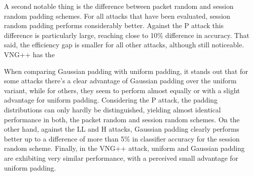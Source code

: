 \documentclass[
	ruledheaders=chapter,
	class=report,
	thesis={type=master, department=inf},
	accentcolor=1c,
	custommargins=true,
	marginpar=false,
	parskip=half-,
	fontsize=11pt,
]{tudapub}
\begin{document}
	A second notable thing is the difference between packet random and session random padding schemes. For all attacks that have been evaluated, session random padding performs considerably better. Against the P attack this difference is particularly large, reaching close to 10\% difference in accuracy. That said, the efficiency gap is smaller for all other attacks, although still noticeable. VNG++ has the 
	
	When comparing Gaussian padding with uniform padding, it stands out that for some attacks there's a clear advantage of Gaussian padding over the uniform variant, while for others, they seem to perform almost equally or with a slight advantage for uniform padding. Considering the P attack, the padding distributions can only hardly be distinguished, yielding almost identical performance in both, the packet random and session random schemes. On the other hand, against the LL and H attacks, Gaussian padding clearly performs better up to a difference of more than 5\% in classifier accuracy for the session random scheme. Finally, in the VNG++ attack, uniform and Gaussian padding are exhibiting very similar performance, with a perceived small advantage for uniform padding.
\end{document}
